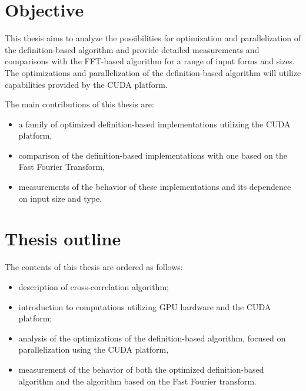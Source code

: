 \section*{Objective}
This thesis aims to analyze the possibilities for optimization and parallelization of the definition-based algorithm and provide detailed measurements and comparisons with the FFT-based algorithm for a range of input forms and sizes. The optimizations and parallelization of the definition-based algorithm will utilize capabilities provided by the CUDA platform.

The main contributions of this thesis are:
\begin{itemize}
	\item a family of optimized definition-based implementations utilizing the CUDA platform,
	\item comparison of the definition-based implementations with one based on the Fast Fourier Transform,
	\item measurements of the behavior of these implementations and its dependence on input size and type.
\end{itemize}

\section*{Thesis outline}
The contents of this thesis are ordered as follows:
\begin{itemize}
	\item description of cross-correlation algorithm;
	\item introduction to computations utilizing GPU hardware and the CUDA platform;
	\item analysis of the optimizations of the definition-based algorithm, focused on parallelization using the CUDA platform,
	\item measurement of the behavior of both the optimized definition-based algorithm and the algorithm based on the Fast Fourier transform.
\end{itemize}



